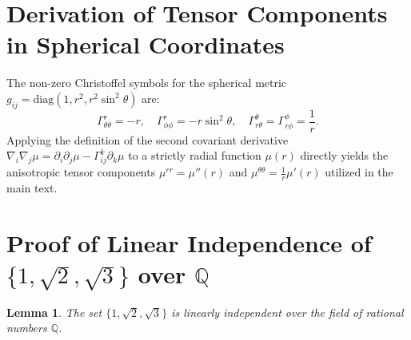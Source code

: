 \documentclass[onecolumn,aps,prd,superscriptaddress,nofootinbib,amsmath,amssymb]{revtex4-2}
\newtheorem{lemma}[theorem]{Lemma}
\theoremstyle{definition}
\theoremstyle{remark}
\begin{document}
\appendix

\section{Derivation of Tensor Components in Spherical Coordinates}
\label{app:tensor}

The non-zero Christoffel symbols for the spherical metric $g_{ij} = \text{diag}(1, r^2, r^2 \sin^2 \theta)$ are:
\begin{equation}
\Gamma^{r}_{\theta\theta} = -r, \quad \Gamma^{r}_{\phi\phi} = -r \sin^2 \theta, \quad \Gamma^{\theta}_{r\theta} = \Gamma^{\phi}_{r\phi} = \frac{1}{r}.
\end{equation}
Applying the definition of the second covariant derivative $\nabla_i \nabla_j \mu = \partial_i \partial_j \mu - \Gamma^k_{ij} \partial_k \mu$ to a strictly radial function $\mu(r)$ directly yields the anisotropic tensor components $\mu^{rr} = \mu''(r)$ and $\mu^{\theta\theta} = \frac{1}{r} \mu'(r)$ utilized in the main text.

\section{Proof of Linear Independence of $\{1, \sqrt{2}, \sqrt{3}\}$ over $\mathbb{Q}$}
\label{app:independence}

\begin{lemma}
The set $\{1, \sqrt{2}, \sqrt{3}\}$ is linearly independent over the field of rational numbers $\mathbb{Q}$.
\end{lemma}
\end{document}

